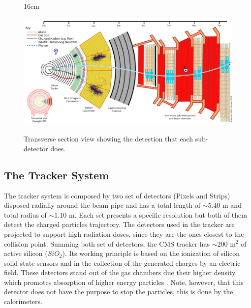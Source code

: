 \begin{figure}[htbp]{16cm}
	\caption{Transverse section view showing the detection that each sub-detector does.}
	\centering
	\includegraphics[scale=0.65,angle=90]{ChapterCMS/figs/cms_deteccao.png}
	\label{fig:cms_fig2}
\end{figure}

\subsection{The Tracker System}
The tracker system is composed by two set of detectors (Pixels and Strips) disposed radially around the beam pipe and has a total length of $\sim$5.40 m and total radius of $\sim$1.10 m. Each set presents a specific resolution but both of them detect the charged particles trajectory. The detectors used in the tracker are projected to support high radiation doses, since they are the ones closest to the collision point. Summing both set of detectors, the CMS tracker has $\sim$200 m$^{2}$ of active silicon ($SiO_{2}$). Its working principle is based on the ionization of silicon solid state sensors and in the collection of the generated charges by an electric field. These detectors stand out of the gas chambers due their higher density, which promotes absorption of higher energy particles \cite{bib:JINST-3-362-2008,bib:CMS-PTDR-2006,bib:grupen-2008}. Note, however, that this detector does not have the purpose to stop the particles, this is done by the calorimeters.

